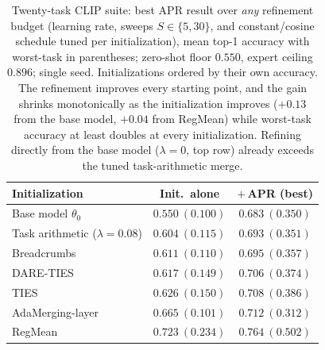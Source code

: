 \documentclass[11pt]{article}
\begin{document}
\begin{table}[t]
\centering
\small
\setlength{\tabcolsep}{5pt}
\caption{Twenty-task CLIP suite: best APR result over \emph{any} refinement budget (learning rate, sweeps $S\in\{5,30\}$, and constant/cosine schedule tuned per initialization), mean top-1 accuracy with worst-task in parentheses; zero-shot floor $0.550$, expert ceiling $0.896$; single seed. Initializations ordered by their own accuracy. The refinement improves every starting point, and the gain shrinks monotonically as the initialization improves ($+0.13$ from the base model, $+0.04$ from RegMean) while worst-task accuracy at least doubles at every initialization. Refining directly from the base model ($\lambda=0$, top row) already exceeds the tuned task-arithmetic merge.}
\label{tab:clip20budget}
\begin{tabular}{lcc}
\toprule
Initialization & Init.\ alone & $+$\,APR (best) \\
\midrule
Base model $\theta_0$              & $0.550\ (0.100)$ & $\mathbf{0.683}\ (0.350)$ \\
Task arithmetic ($\lambda{=}0.08$) & $0.604\ (0.115)$ & $\mathbf{0.693}\ (0.351)$ \\
Breadcrumbs                        & $0.611\ (0.110)$ & $\mathbf{0.695}\ (0.357)$ \\
DARE-TIES                          & $0.617\ (0.149)$ & $\mathbf{0.706}\ (0.374)$ \\
TIES                               & $0.626\ (0.150)$ & $\mathbf{0.708}\ (0.386)$ \\
AdaMerging-layer                   & $0.665\ (0.101)$ & $\mathbf{0.712}\ (0.312)$ \\
RegMean                            & $0.723\ (0.234)$ & $\mathbf{0.764}\ (0.502)$ \\
\bottomrule
\end{tabular}
\end{table}
\end{document}
